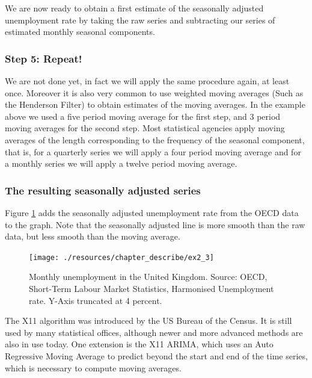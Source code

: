 \documentclass[
]{book}
\begin{document}
We are now ready to obtain a first estimate of the seasonally adjusted unemployment rate by taking the raw series and subtracting our series of estimated monthly seasonal components.

\hypertarget{step-5-repeat}{%
\subsubsection*{Step 5: Repeat!}\label{step-5-repeat}}

We are not done yet, in fact we will apply the same procedure again, at least once. Moreover it is also very common to use weighted moving averages (Such as the Henderson Filter) to obtain estimates of the moving averages. In the example above we used a five period moving average for the first step, and 3 period moving averages for the second step. Most statistical agencies apply moving averages of the length corresponding to the frequency of the seasonal component, that is, for a quarterly series we will apply a four period moving average and for a monthly series we will apply a twelve period moving average.

\hypertarget{the-resulting-seasonally-adjusted-series}{%
\subsubsection*{The resulting seasonally adjusted series}\label{the-resulting-seasonally-adjusted-series}}

Figure \ref{fig:desc7} adds the seasonally adjusted unemployment rate from the OECD data to the graph. Note that the seasonally adjusted line is more smooth than the raw data, but less smooth than the moving average.

\begin{figure}

{\centering \texttt{[image: ./resources/chapter\_describe/ex2\_3]} 

}

\caption{Monthly unemployment in the United Kingdom. Source: OECD, Short-Term Labour Market Statistics, Harmonised Unemployment rate.  Y-Axis truncated at 4 percent.}\label{fig:desc7}
\end{figure}

The X11 algorithm was introduced by the US Bureau of the Census. It is still used by many statistical offices, although newer and more advanced methods are also in use today. One extension is the X11 ARIMA, which uses an Auto Regressive Moving Average to predict beyond the start and end of the time series, which is necessary to compute moving averages.
\end{document}
